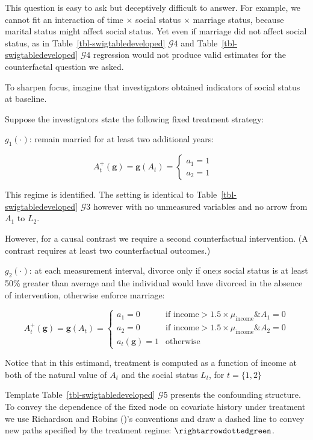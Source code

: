 \documentclass[
  single column]{article}
\begin{document}
This question is easy to ask but deceptively difficult to answer. For
example, we cannot fit an interaction of time \(\times\) social status
\(\times\) marriage status, because marital status might affect social
status. Yet even if marriage did not affect social status, as in
Table~\ref{tbl-swigtabledeveloped} \(\mathcal{G}4\) and
Table~\ref{tbl-swigtabledeveloped} \(\mathcal{G}4\) regression would not
produce valid estimates for the counterfactal question we asked.

To sharpen focus, imagine that investigators obtained indicators of
social status at baseline.

Suppose the investigators state the following fixed treatment strategy:

\(g_1(\cdot)\): remain married for at least two additional years:

\[
A_t^{+}(\mathbf{g}) = \mathbf{g}(A_{t}) = \begin{cases} 
   a_{1} = 1 & \\ 
   a_{2} = 1 &   
    \end{cases}
\]

This regime is identified. The setting is identical to
Table~\ref{tbl-swigtabledeveloped} \(\mathcal{G}3\) however with no
unmeasured variables and no arrow from \(A_1\) to \(L_2\).

However, for a causal contrast we require a second counterfactual
intervention. (A contrast requires at least two counterfactual
outcomes.)

\(g_2(\cdot)\): at each measurement interval, divorce only if one;s
social status is at least 50\% greater than average and the individual
would have divorced in the absence of intervention, otherwise enforce
marriage:

\[
A_t^{+}(\mathbf{g}) = \mathbf{g}(A_{t}) = \begin{cases} 
   a_{1} = 0 & \text{if income} > 1.5 \times  \mu_{\text{income}} \& A_1 = {0} \\ 
   a_{2} = 0 & \text{if income} > 1.5 \times  \mu_{\text{income}} \& A_2 = {0} \\ 
   a_{t}(\mathbf{g}) = 1 & \text{otherwise} 
   \end{cases}
\]

Notice that in this estimand, treatment is computed as a function of
income at both of the natural value of \(A_t\) and the social status
\(L_t\), for \(t = \{1,2\}\)

Template Table~\ref{tbl-swigtabledeveloped} \(\mathcal{G}5\) presents
the confounding structure. To convey the dependence of the fixed node on
covariate history under treatment we use Richardson and Robins
()'s conventions and draw a dashed
line to convey new paths specified by the treatment regime:
\(\rightarrowdottedgreen\).
\end{document}
